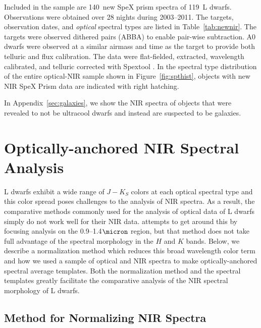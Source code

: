 \documentclass[12pt]{aastex6}
\newcommand{\NewPrismSpectra}{140} %
\newcommand{\NewPrismObjects}{119} %
\begin{document}
\label{sec:obs_new_nir}
Included in the sample are \NewPrismSpectra~new SpeX prism spectra of \NewPrismObjects~L dwarfs.
Observations were obtained over 28 nights during 2003--2011. The targets, observation dates, and \emph{optical} spectral types are listed in Table~\ref{tab:newnir}.
The targets were observed dithered pairs (ABBA) to enable pair-wise subtraction. A0 dwarfs were observed at a similar airmass and time as the target to provide both telluric and flux calibration.
The data were flat-fielded, extracted, wavelength calibrated, and telluric corrected with Spextool \citep{Cushing04,Spextool2}.
In the spectral type distribution of the entire optical-NIR sample shown in Figure~\ref{fig:spthist}, objects with new NIR SpeX Prism data are indicated with right hatching.

In Appendix~\ref{sec:galaxies}, we show the NIR spectra of objects that were revealed to not be ultracool dwarfs and instead are suspected to be galaxies.


%

\section{Optically-anchored NIR Spectral Analysis}

L dwarfs exhibit a wide range of $J-K_S$ colors at each optical spectral type \cite[e.g.,][]{Kirkpatrick08, Schmidt10, Faherty:2012cy} and this color spread poses challenges to the analysis of NIR spectra.
As a result, the comparative methods commonly used for the analysis of optical data of L dwarfs simply do not work well for their NIR data.
\citet{Kirkpatrick10} attempts to get around this by focusing analysis on the 0.9--1.4$\micron$ region, but that method does not take full advantage of the spectral morphology in the $H$ and $K$ bands.
Below, we describe a normalization method which reduces this broad wavelength color term and how we used a sample of optical and NIR spectra to make optically-anchored spectral average templates.
Both the normalization method and the spectral templates greatly facilitate the comparative analysis of the NIR spectral morphology of L dwarfs.

\subsection{Method for Normalizing NIR Spectra}
\label{sec:method}
\end{document}
